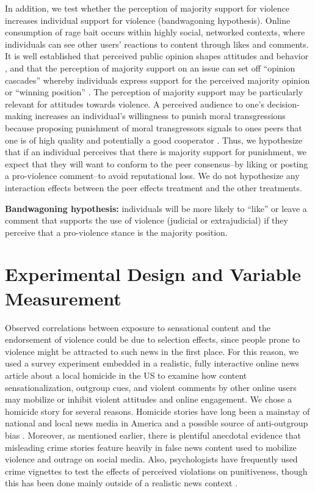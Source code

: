 \vspace{1em}
In addition, we test whether the perception of majority support for violence increases individual support for violence (bandwagoning hypothesis). Online consumption of rage bait occurs within highly social, networked contexts, where individuals can see other users' reactions to content through likes and comments. It is well established that perceived public opinion shapes attitudes and behavior \citep{neubaum2017monitoring,noelleneumann1993spiral}, and that the perception of majority support on an issue can set off ``opinion cascades'' whereby individuals express support for the perceived majority opinion or ``winning position'' \citep{rothschild2014public, mutz1992impersonal}. The perception of majority support may be particularly relevant for attitudes towards violence. A perceived audience to one's decision-making increases an individual's willingness to punish moral transgressions \citep{kurzban2007audience} because proposing punishment of moral transgressors signals to ones peers that one is of high quality and potentially a good cooperator \citep{fessler2003strategy,gintis2001costly}. Thus, we hypothesize that if an individual perceives that there is majority support for punishment, we expect that they will want to conform to the peer consensus--by liking or posting a pro-violence comment--to avoid reputational loss. We do not hypothesize any interaction effects between the peer effects treatment and the other treatments.

\vspace{1em}
\noindent\textbf{Bandwagoning hypothesis:} individuals will be more likely to ``like'' or leave a comment that supports the use of violence (judicial or extrajudicial) if they perceive that a pro-violence stance is the majority position.

\section{Experimental Design and Variable Measurement}

Observed correlations between exposure to sensational content and the endorsement of violence could be due to selection effects, since people prone to violence might be attracted to such news in the first place. For this reason, we used a survey experiment embedded in a realistic, fully interactive online news article about a local homicide in the US to examine how content sensationalization, outgroup cues, and violent comments by other online users may mobilize or inhibit violent attitudes and online engagement. We chose a homicide story for several reasons. Homicide stories have long been a mainstay of national and local news media in America and a possible source of anti-outgroup bias \citep{gilliam2000prime}. Moreover, as mentioned earlier, there is plentiful anecdotal evidence that misleading crime stories feature heavily in false news content used to mobilize violence and outrage on social media. Also, psychologists have frequently used crime vignettes to test the effects of perceived violations on punitiveness, though this has been done mainly outside of a realistic news context \citep{fincher2016perceptual, tetlock2007,gross2008framing}. 

